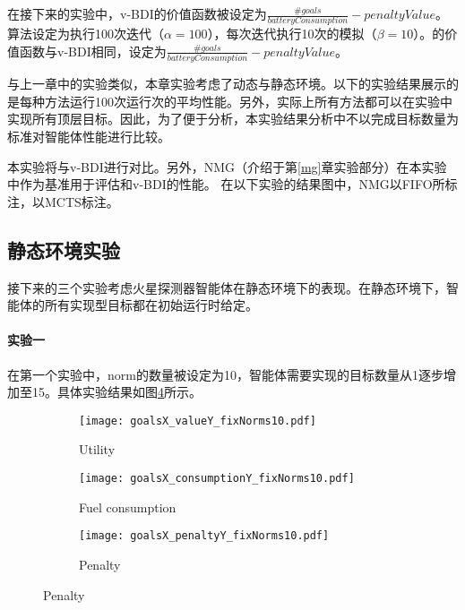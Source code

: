 在接下来的实验中，v-BDI的价值函数被设定为$\frac{\#goals}{batteryConsumption} - penaltyValue$。\SAN 算法设定为执行100次迭代（$\alpha = 100$），每次迭代执行10次的模拟（$\beta = 10$）。\SAN 的价值函数与v-BDI相同，设定为$\frac{\#goals}{batteryConsumption} - penaltyValue$。

与上一章中的实验类似，本章实验考虑了动态与静态环境。以下的实验结果展示的是每种方法运行100次运行次的平均性能。另外，实际上所有方法都可以在实验中实现所有顶层目标。因此，为了便于分析，本实验结果分析中不以完成目标数量为标准对智能体性能进行比较。

本实验将\SAN 与v-BDI进行对比。另外，NMG（介绍于第\ref{mg}章实验部分）在本实验中作为基准用于评估\SAN 和v-BDI的性能。
在以下实验的结果图中，NMG以FIFO所标注，\SAN 以MCTS标注。
\subsection{静态环境实验}
接下来的三个实验考虑火星探测器智能体在静态环境下的表现。在静态环境下，智能体的所有实现型目标都在初始运行时给定。
\paragraph{实验一}
在第一个实验中，norm的数量被设定为10，智能体需要实现的目标数量从1逐步增加至15。具体实验结果如图\ref{fig:all_fixNorms10}所示。

\begin{figure}
\centering
\begin{subfigure}{.47\textwidth}
  \centering
  \texttt{[image: goalsX\_valueY\_fixNorms10.pdf]}
  \captionsetup{justification=centering}
  \caption{Utility}
  \label{fig:goalsX_valueY_fixNorms10}
\end{subfigure}

\begin{subfigure}{.47\textwidth}
  \centering
  \texttt{[image: goalsX\_consumptionY\_fixNorms10.pdf]}
  \captionsetup{justification=centering}
  \caption{Fuel consumption}
  \label{fig:goalsX_consumptionY_fixNorms10}
\end{subfigure}
\begin{subfigure}{.47\textwidth}
  \centering
  \texttt{[image: goalsX\_penaltyY\_fixNorms10.pdf]}
  \captionsetup{justification=centering}
  \caption{Penalty}
  \label{fig:goalsX_penaltyY_fixNorms10}
\end{subfigure}
\captionsetup{justification=centering}
\label{fig:all_fixNorms10}
\end{figure}

